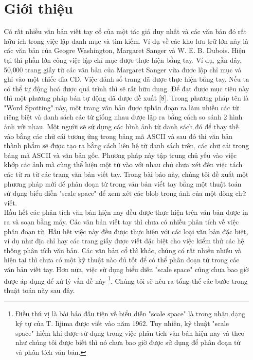 \documentclass[a4paper]{article}
\begin{document}
\section{Giới thiệu}
Có rất nhiều văn bản viết tay cổ của một tác giả duy nhất và các văn bản đó rất hữu ích trong việc lập danh mục và tìm kiếm. Ví dụ về các kho lưu trữ lớn này là các văn bản của Geogre Washington, Margaret Sanger và W. E. B. Dubois. Hiện tại thì phần lớn công việc lập chỉ mục được thực hiện bằng tay. Ví dụ, gần đây, 50,000 trang giấy từ các văn bản của Margaret Sanger vừa được lập chỉ mục và ghi vào một chiếc đĩa CD. Việc đánh số trang đã được thực hiện bằng tay. Nếu ta có thể tự động hoá được quá trình thì sẽ rất hữu dụng. Để đạt được mục tiêu này thì một phương pháp bán tự động đã được đề xuất [8]. Trong phương pháp tên là "Word Spotting" này, một trang văn bản được tphân đoạn ra làm nhiều các từ riêng biệt và danh sách các từ giống nhau được lập ra bằng cách so sánh 2 hình ảnh với nhau. Một người sẽ sử dụng các hình ảnh từ danh sách đó để thay thế vào bằng các chữ cái tương ứng trong bảng mã ASCII và sau đó thì văn bản thành phẩm sẽ được tạo ra bằng cách liên hệ từ danh sách trên, các chữ cái trong bảng mã ASCII và văn bản gốc. Phương pháp này tập trung chủ yếu vào việc khớp các ảnh mà cùng thể hiện một từ vào với nhau chứ chưa xét đến việc tách các từ ra từ các trang văn bản viết tay. Trong bài báo này, chúng tôi đề xuất một phương pháp mới để phân đoạn từ trong văn bản viết tay bằng một thuật toán sử dụng biểu diễn "scale space" để xem xét các blob trong ảnh của một dòng chữ viết.\\
Hầu hết các phân tích văn bản hiện nay đều được thực hiện trên văn bản được in ra và soạn bằng máy. Các văn bản viết tay thì chưa có nhiều phân tích về việc phân đoạn từ. Hầu hết việc này đều được thực hiện với các loại văn bản đặc biệt, ví dụ như địa chỉ hay các trang giấy được viết đặc biệt cho việc kiểm thử các hệ thống phân tích văn bản. Các văn bản cổ thì khác, chúng có rất nhiều nhiễu và hiện tại thì chưa có một kỹ thuật nào đủ tốt để có thể phân đoạn từ trong các văn bản viết tay. Hơn nữa, việc sử dụng biểu diễn "scale space" cũng chưa bao giờ được áp dụng để xử lý vấn đề này \footnote{Điều thú vị là bài báo đầu tiên về biểu diễn "scale space" là trong nhận dạng ký tự của T. Iijima được viết vào năm 1962. Tuy nhiên, kỹ thuật "scale space" hiếm khi được sử dụng trong việc phân tích văn bản hiện nay và theo như chúng tôi được biết thì nó chưa bao giờ được sử dụng để phân đoạn từ và phân tích văn bản.}. Chúng tôi sẽ nêu ra tổng thể các bước trong thuật toán này sau đây.\\
\end{document}
